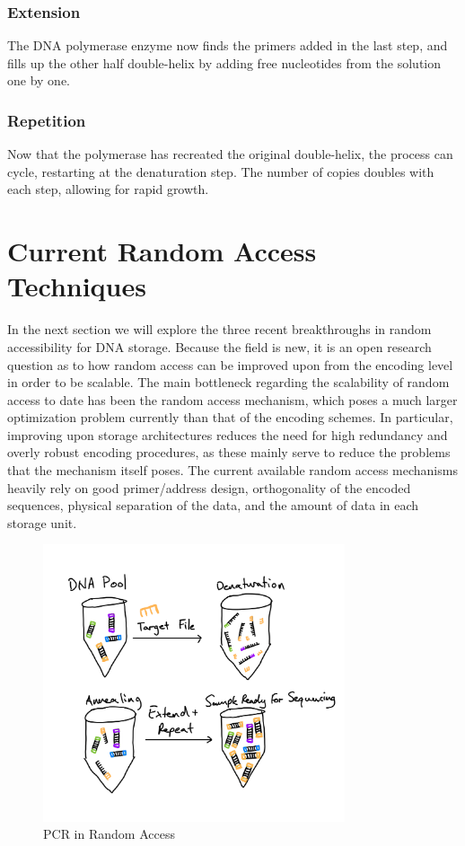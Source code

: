 \documentclass[a4paper,conference]{IEEEtran}
\begin{document}
\subsubsection{Extension}
The DNA polymerase enzyme now finds the primers added in the last step, and fills up the other half double-helix by adding free nucleotides from the solution one by one.\\
\subsubsection{Repetition}
Now that the polymerase has recreated the original double-helix, the process can cycle, restarting at the denaturation step. The number of copies doubles with each step, allowing for rapid growth.\\

\section{Current Random Access Techniques}
In the next section we will explore the three recent breakthroughs in random accessibility for DNA storage. Because the field is new, it is an open research question as to how random access can be improved upon from the encoding level in order to be scalable. The main bottleneck regarding the scalability of random access to date has been the random access mechanism, which poses a much larger optimization problem currently than that of the encoding schemes. In particular, improving upon storage architectures reduces the need for high redundancy and overly robust encoding procedures, as these mainly serve to reduce the problems that the mechanism itself poses. The current available random access mechanisms heavily rely on good primer/address design, orthogonality of the encoded sequences, physical separation of the data, and the amount of data in each storage unit.

\begin{figure}[!t]
\centering
\includegraphics[width=3.5in]{pcrRA}
\caption{PCR in Random Access}
\label{fig_sim}
\end{figure}
\end{document}
